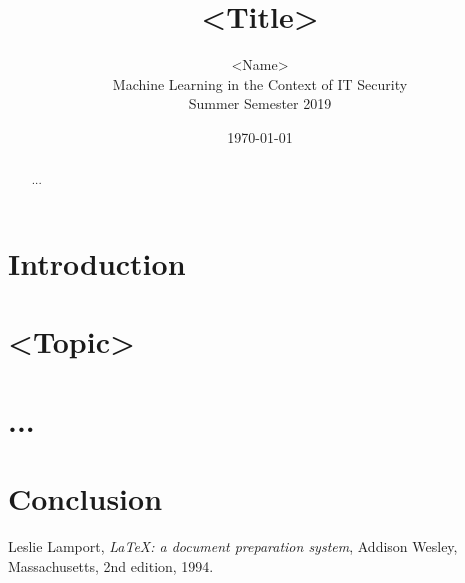 \documentclass[fontsize=12pt,a4paper]{scrartcl}
\title{<Title>}
\author{<Name>\\
		Machine Learning in the Context of IT Security\\
		Summer Semester 2019\\}
\date{\today}
\begin{document}
	\maketitle
	
	\begin{abstract}
		...
	\end{abstract}

	\section{Introduction}
	
	\section{<Topic>}
	
	\section{...}
	
	\section{Conclusion}
	
	\newpage
	\begin{thebibliography}{9}
		
		Leslie Lamport,
		\textit{\LaTeX: a document preparation system},
		Addison Wesley, Massachusetts,
		2nd edition,
		1994.
		
	\end{thebibliography}
\end{document}
